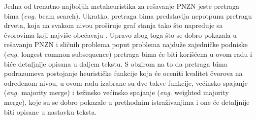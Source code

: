 \documentclass[12pt,oneside]{memoir}
\begin{document}
Jedna od trenutno najboljih metaheuristika za rešavanje PNZN jeste pretraga bima (\textit{eng.} beam search). Ukratko, pretraga
bima predstavlja nepotpunu pretragu drveta, koja na svakom nivou proširuje graf stanja tako što napreduje sa čvorovima koji najviše
obećavaju \cite{SCSBS}. Upravo zbog toga što se dobro pokazala u rešavanju PNZN i sličnih problema poput problema najduže zajedničke podniske
(\textit{eng.} longest common subsequence) pretraga bima će biti korišćena u ovom radu i biće detaljnije opisana u daljem tekstu.
S obzirom na to da pretraga bima podrazumeva postojanje heurističke funkcije koja će oceniti kvalitet čvorova na određenom nivou,
u ovom radu izabrane su dve takve funkcije, većinsko spajanje (\textit{eng.} majority merge) i težinsko većinsko spajanje
(\textit{eng.} weighted majority merge), koje su se dobro pokazale u prethodnim istraživanjima i one će detaljnije biti 
opisane u nastavku teksta.




\end{document}
